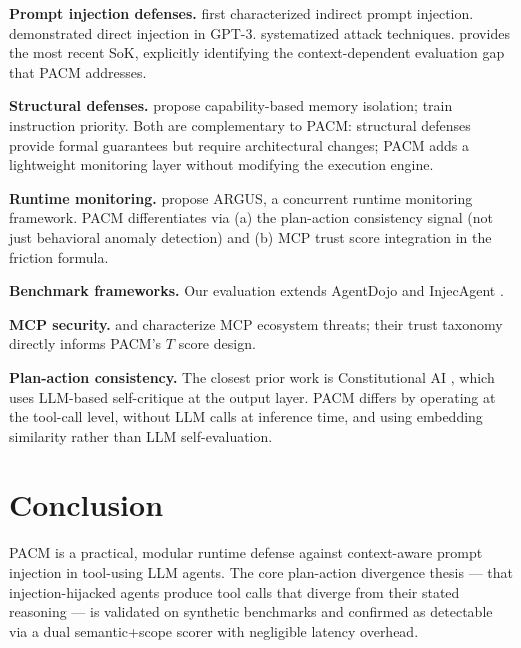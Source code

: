 \documentclass[11pt,letterpaper]{article}
\newcommand{\pacm}{\textsc{PACM}}
\newcommand{\mcp}{\textsc{MCP}}
\begin{document}
\textbf{Prompt injection defenses.}
\citet{Greshake2023NotWhatYouSignedUp} first characterized indirect prompt
injection. \citet{Perez2022IgnorePrevious} demonstrated direct injection in
GPT-3. \citet{Liu2023PromptInjectionAttack} systematized attack techniques.
\citet{Wang2026AgentPI} provides the most recent SoK, explicitly identifying
the context-dependent evaluation gap that \pacm{} addresses.

\textbf{Structural defenses.}
\citet{Debenedetti2025CaMeL} propose capability-based memory isolation;
\citet{Wallace2024InstructionHierarchy} train instruction priority.
Both are complementary to \pacm{}: structural defenses provide formal
guarantees but require architectural changes; \pacm{} adds a lightweight
monitoring layer without modifying the execution engine.

\textbf{Runtime monitoring.}
\citet{Weng2026ARGUS} propose ARGUS, a concurrent runtime monitoring
framework. \pacm{} differentiates via (a) the plan-action consistency
signal (not just behavioral anomaly detection) and (b) \mcp{} trust
score integration in the friction formula.

\textbf{Benchmark frameworks.}
Our evaluation extends AgentDojo \citep{Debenedetti2024AgentDojo} and
InjecAgent \citep{Zhan2024InjecAgent}.

\textbf{\mcp{} security.}
\citet{Li2025MCPEcosystem} and \citet{Hasan2026MCPFirstGlance} characterize
\mcp{} ecosystem threats; their trust taxonomy directly informs \pacm{}'s $T$
score design.

\textbf{Plan-action consistency.}
The closest prior work is Constitutional AI \citep{Bai2022ConstitutionalAI},
which uses LLM-based self-critique at the output layer. \pacm{} differs by
operating at the tool-call level, without LLM calls at inference time, and
using embedding similarity rather than LLM self-evaluation.

\section{Conclusion}
\label{sec:conclusion}

\pacm{} is a practical, modular runtime defense against context-aware prompt
injection in tool-using LLM agents. The core plan-action divergence thesis
--- that injection-hijacked agents produce tool calls that diverge from their
stated reasoning --- is validated on synthetic benchmarks and confirmed as
detectable via a dual semantic+scope scorer with negligible latency overhead.
\end{document}
